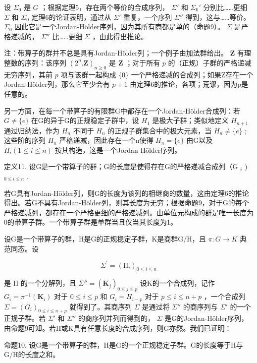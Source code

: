 设 \(\Sigma_0\) 是 \(G\) ；根据定理5，存在两个等价的合成序列， \(\Sigma'\) 和 \(\Sigma_0'\) 分别比……更细 \(\Sigma\) 和 \(\Sigma_0\) 定理6的论证表明，通过从 \(\Sigma'\) 重复，一个序列 \(\Sigma''\) 得到，这与……等价。 \(\Sigma_0\) 因此它是一个Jordan-Hölder序列，因为其所有商都是单的（命题9）。 \(\Sigma\) 是严格递减的， \(\Sigma''\) 比……更细 \(\Sigma\) ，由此得出推论。

注：带算子的群并不总是具有Jordan-Hölder列；一个例子由加法群给出。 \(\mathbf{Z}\) 有理整数的序列：该序列 \((2^{n}.\mathbf{Z})_{n\geqslant 0}\) 是 \(\mathbf{Z}\) ；对于所有 \(p\) 的（正规）子群的严格递减无穷序列，其前 \(p\) 项与该群一起构成 \(\{0\}\) 一个严格递减的合成列；如果Z存在一个Jordan-Hölder列，那么它至少会有 \(p + 1\) 由定理6的推论，各项；荒谬，因为p是任意的。

另一方面，在每一个带算子的有限群G中都存在一个Jordan-Hölder合成列：若 \(G \neq \{e\}\) 在G的异于G的正规稳定子群中，设 \(H_{1}\) 是极大子群；类似地定义 \(H_{n+1}\) 通过归纳法，作为 \(H_{n}\) 不同于 \(H_{n}\) 的正规子群集合中的极大元素，当 \(H_{n} \neq \{e\}\) ; 这些阶的序列 \(H_{n}\) 严格递减，因此存在一个n使得 \(H_{n} = \{e\}\) 由G以及 \(H_{i} (1 \leqslant i \leqslant n)\) 按其构造，这是一个Jordan-Hölder序列。

定义11. 设G是一个带算子的群；G的长度是使得存在G的严格递减合成列（G \(_{i}\) ) \(_{0 \leq i \leq n}\) .

若G具有Jordan-Hölder列，则G的长度为该列的相继商的数量，这由定理6的推论得出。若G不具有Jordan-Hölder列，则其长度为无穷；根据命题9，对于G的每个严格递减列，都存在一个严格更细的严格递减列。由单位元构成的群是唯一长度为0的带算子群。一个带算子群是单群当且仅当其长度为1。

设G是一个带算子的群，H是G的正规稳定子群，K是商群G/H，且 \(\pi: G \rightarrow K\) 典范同态。设

\[
\Sigma^ {\prime} = \left(\mathrm{H} _ {i}\right) _ {0 \leqslant i \leqslant n}
\]

是 H 的一个分解列，且 \(\Sigma'' = (\mathbf{K}_j)_{0 \leqslant j \leqslant p}\) 设K的一个合成列，记作 \(G_i = \pi^{-1}(\mathbf{K}_i)\) 对于 \(0 \leqslant i \leqslant p\) 和 \(G_i = H_{i-p}\) 对于 \(p \leqslant i \leqslant n + p\) ，一个合成列 \(\Sigma = (G_i)_{0 \leqslant i \leqslant n+p}\) 就得到了。其商序列 \(\Sigma\) 是通过将 \(\Sigma''\) 的商序列与 \(\Sigma'\) 的一个正规子群。若 \(\Sigma'\) 和 \(\Sigma''\) 的商序列并列而得到的， \(\Sigma\) 是G的Jordan-Hölder序列，由命题9可知。若H或K具有任意长度的合成序列，则G亦然。我们已证明：

命题10. 设G是一个带算子的群，H是G的一个正规稳定子群。G的长度等于H与G/H的长度之和。

